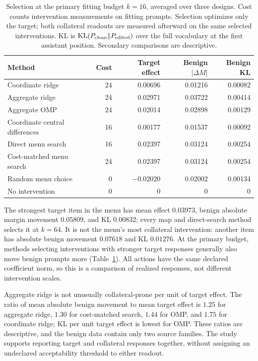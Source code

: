 \begin{table}[t]
\centering
\begin{tabular}{lrrrr}
\toprule
Method & Cost & Target effect & Benign $|\Delta M|$ & Benign KL \\
\midrule
Coordinate ridge & 24 & 0.00696 & 0.01216 & 0.00082 \\
Aggregate ridge & 24 & 0.02971 & 0.03722 & 0.00414 \\
Aggregate OMP & 24 & 0.02014 & 0.02898 & 0.00129 \\
Coordinate central differences & 16 & 0.00177 & 0.01537 & 0.00092 \\
Direct menu search & 16 & 0.02397 & 0.03124 & 0.00254 \\
Cost-matched menu search & 24 & 0.02397 & 0.03124 & 0.00254 \\
Random menu choice & 0 & $-0.02020$ & 0.02002 & 0.00134 \\
No intervention & 0 & 0 & 0 & 0 \\
\bottomrule
\end{tabular}
\caption{Selection at the primary fitting budget $k=16$, averaged over three designs. Cost counts intervention measurements on fitting prompts. Selection optimizes only the target; both collateral readouts are measured afterward on the same selected interventions. KL is $\mathrm{KL}(P_{\rm clean}\Vert P_{\rm edited})$ over the full vocabulary at the first assistant position. Secondary comparisons are descriptive.}
\label{tab:gemma-selection}
\end{table}

The strongest target item in the menu has mean effect $0.03973$, benign absolute margin movement $0.05809$, and KL $0.00832$; every map and direct-search method selects it at $k=64$. It is not the menu's most collateral intervention: another item has absolute benign movement $0.07618$ and KL $0.01276$. At the primary budget, methods selecting interventions with stronger target responses generally also move benign prompts more (Table~\ref{tab:gemma-selection}). All actions have the same declared coefficient norm, so this is a comparison of realized responses, not different intervention scales.

Aggregate ridge is not unusually collateral-prone per unit of target effect. The ratio of mean absolute benign movement to mean target effect is $1.25$ for aggregate ridge, $1.30$ for cost-matched search, $1.44$ for OMP, and $1.75$ for coordinate ridge; KL per unit target effect is lowest for OMP. These ratios are descriptive, and the benign data contain only two source families. The study supports reporting target and collateral responses together, without assigning an undeclared acceptability threshold to either readout.

